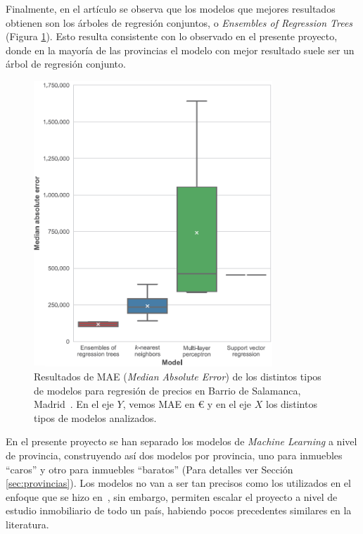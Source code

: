 Finalmente, en el artículo se observa que los modelos que mejores resultados obtienen son los árboles de regresión conjuntos, o \textit{Ensembles of Regression Trees} (Figura \ref{fig:model_results_baldominos}). Esto resulta consistente con lo observado en el presente proyecto, donde en la mayoría de las provincias el modelo con mejor resultado suele ser un árbol de regresión conjunto. 

\begin{figure}[ht]
    \centering
    \includegraphics[width=0.8\textwidth]{img/Figura9.PNG}
    \caption[Resultados de MAE (Median Absolute Error) de los distintos tipos de modelos para regresión de precios en Barrio de Salamanca, Madrid]{Resultados de MAE (\textit{Median Absolute Error}) de los distintos tipos de modelos para regresión de precios en Barrio de Salamanca, Madrid~\cite{baldominos2018}. En el eje $Y$, vemos MAE en € y en el eje $X$ los distintos tipos de modelos analizados.}
    \label{fig:model_results_baldominos}
\end{figure}


En el presente proyecto se han separado los modelos de \textit{Machine Learning} a nivel de provincia, construyendo así dos modelos por provincia, uno para inmuebles ``caros'' y otro para inmuebles ``baratos'' (Para detalles ver Sección \ref{sec:provincias}). Los modelos no van a ser tan precisos como los utilizados en el enfoque que se hizo en~\cite{baldominos2018},  sin embargo, permiten escalar el proyecto a nivel de estudio inmobiliario de todo un país, habiendo pocos precedentes similares en la literatura.



